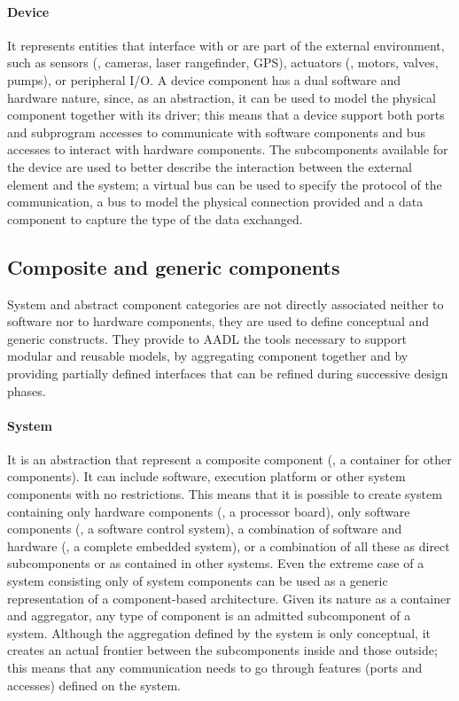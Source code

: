 \paragraph{Device} It represents entities that interface with or are part of the external environment, such as sensors (\eg, cameras, laser rangefinder, GPS), actuators (\eg, motors, valves, pumps), or peripheral I/O. A device component has a dual software and hardware nature, since, as an abstraction, it can be used to model the physical component together with its driver; this means that a device support both ports and subprogram accesses to communicate with software components and bus accesses to interact with hardware components. The subcomponents available for the device are used to better describe the interaction between the external element and the system; a virtual bus can be used to specify the protocol of the communication, a bus to model the physical connection provided and a data component to capture the type of the data exchanged.

\subsection[Composite and generic components]{Composite and generic components}
System and abstract component categories are not directly associated neither to software nor to hardware components, they are used to define conceptual and generic constructs. They provide to AADL the tools necessary to support modular and reusable models, by aggregating component together and by providing partially defined interfaces that can be refined during successive design phases.

\paragraph{System} It is an abstraction that represent a composite component (\ie, a container for other components). It can include software, execution platform or other system components with no restrictions. This means that it is possible to create system containing only hardware components (\eg, a processor board), only software components (\eg, a software control system), a combination of software and hardware (\eg, a complete embedded system),  or a combination of all these as direct subcomponents or as contained in other systems. Even the extreme case of a system consisting only of system components can be used as a generic representation of a component-based architecture. Given its nature as a container and aggregator, any type of component is an admitted subcomponent of a system. Although the aggregation defined by the system is only conceptual, it creates an actual frontier between the subcomponents inside and those outside; this means that any communication needs to go through features (\ie ports and accesses) defined on the system.

